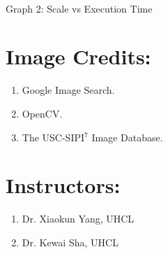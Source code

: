 \documentclass[12pt]{elsarticle}
\begin{document}
\begin{center}
\\Graph 2: Scale vs Execution Time
\end{center}

\section{Image Credits:}
\label{S:5}
\begin{enumerate}
\item Google Image Search.
\item OpenCV.
\item The USC-SIPI$^7$ Image Database.
\end{enumerate}

\section{Instructors:}
\label{S:6}
\begin{enumerate}
\item Dr. Xiaokun Yang, UHCL
\item Dr. Kewai Sha, UHCL
\end{enumerate}
\end{document}
